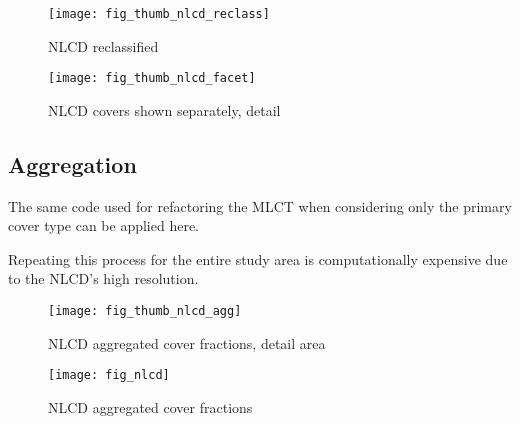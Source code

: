 \begin{figure}[hpt] 
\begin{center}


\texttt{[image: fig\_thumb\_nlcd\_reclass]}
\end{center} 
\caption{NLCD reclassified} 
\label{fig:thumb_nlcd_reclass} 
\end{figure} 

\begin{figure}[hpt] 
\begin{center}
  

\texttt{[image: fig\_thumb\_nlcd\_facet]}
\end{center} 
\caption{NLCD covers shown separately, detail} 
\label{fig:thumb_nlcd_facet} 
\end{figure} 

\subsection{Aggregation}
\label{sec:nlcd-aggr}

The same code used for refactoring the MLCT when considering only the
primary cover type can be applied here.

Repeating this process for the entire study area is computationally
expensive due to the NLCD's high resolution.


 

\begin{figure}[hpt] 
\begin{center}
  


\texttt{[image: fig\_thumb\_nlcd\_agg]}
\end{center} 
\caption{NLCD aggregated cover fractions, detail area}
\label{fig:thumb_nlcd_agg}
\end{figure} 



\begin{figure}[hpt] 
\begin{center}
  


\texttt{[image: fig\_nlcd]}
\end{center} 
\caption{NLCD aggregated cover fractions}
\label{fig:nlcd}
\end{figure} 

